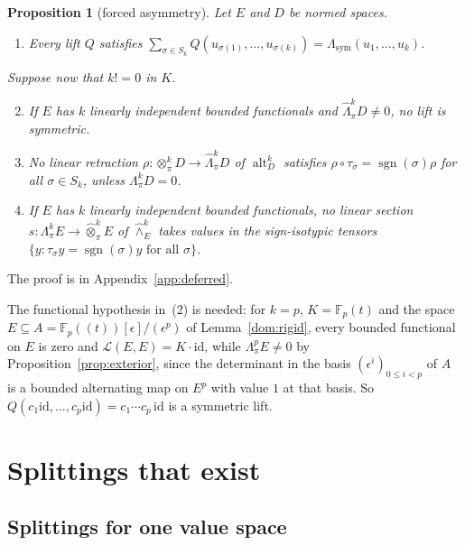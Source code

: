 \documentclass[11pt]{amsart}
\newtheorem{proposition}[theorem]{Proposition}
\theoremstyle{definition}
\theoremstyle{remark}
\numberwithin{equation}{section}
\newcommand{\F}{\mathbb F}
\newcommand{\cL}{\mathcal L}
\newcommand{\sgn}{\operatorname{sgn}}
\newcommand{\id}{\mathrm{id}}
\theoremstyle{plain}
\theoremstyle{definition}
\theoremstyle{plain}
\newcommand{\Lsym}{\Lambda_{\mathrm{sym}}}
\begin{document}
\begin{proposition}[forced asymmetry]\label{can:prop:asymmetry}
Let $E$ and $D$ be normed spaces.
\begin{enumerate}
\item Every lift $Q$ satisfies $\sum_{\sigma\in S_k}Q(u_{\sigma(1)},\dots,u_{\sigma(k)})=\Lsym(u_1,\dots,u_k)$.
\end{enumerate}
Suppose now that $k!=0$ in $K$.
\begin{enumerate}\setcounter{enumi}{1}
\item If $E$ has $k$ linearly independent bounded functionals and $\widehat\Lambda^k_\pi D\ne0$, no lift is symmetric.
\item No linear retraction $\rho\colon\otimes^k_\pi D\to\widehat\Lambda^k_\pi D$ of $\operatorname{alt}^k_D$ satisfies
$\rho\circ\tau_\sigma=\sgn(\sigma)\rho$ for all $\sigma\in S_k$, unless $\Lambda^k_\pi D=0$.
\item If $E$ has $k$ linearly independent bounded functionals, no linear section
$s\colon\Lambda^k_\pi E\to\widehat\otimes^k_\pi E$ of $\widehat\wedge^k_E$ takes values in the sign-isotypic tensors
$\{y:\tau_\sigma y=\sgn(\sigma)y\text{ for all }\sigma\}$.
\end{enumerate}
\end{proposition}

The proof is in Appendix~\ref{app:deferred}.

The functional hypothesis in~(2) is needed: for $k=p$, $K=\F_p(t)$ and the space
$E\subseteq A=\F_p((t))[\epsilon]/(\epsilon^p)$ of Lemma~\ref{dom:rigid}, every bounded functional on $E$ is zero and
$\cL(E,E)=K\cdot\id$, while $\Lambda^p_\pi E\ne0$ by Proposition~\ref{prop:exterior}, since the determinant in the basis
$(\epsilon^i)_{0\le i<p}$ of $A$ is a bounded alternating map on $E^p$ with value $1$ at that basis. So
$Q(c_1\id,\dots,c_p\id)=c_1\cdots c_p\,\id$ is a symmetric lift.
\section{Splittings that exist}\label{sec:positive}

\subsection{Splittings for one value space}\label{spl:ssec:one-value}
\end{document}
